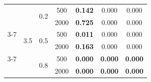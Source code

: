 \documentclass[10pt,a4paper]{amsart}
\numberwithin{equation}{section}
\begin{document}
\begin{table}[H]
\begin{tabular}{ccccccc}
& \multirow{6}{*}{3.5}
& \multirow{2}{*}{0.2}
& 500  & \textbf{0.142} & 0.000 & 0.000 \\
&  &  & 2000 & \textbf{0.725} & 0.000 & 0.000 \\
\cline{3-7}
&  & \multirow{2}{*}{0.5}
& 500  & \textbf{0.011} & 0.000 & 0.000 \\
&  &  & 2000 & \textbf{0.163} & 0.000 & 0.000 \\
\cline{3-7}
&  & \multirow{2}{*}{0.8}
& 500  & \textbf{0.000} & \textbf{0.000} & \textbf{0.000} \\
&  &  & 2000 & \textbf{0.000} & \textbf{0.000} & \textbf{0.000} \\
\hline

\end{tabular}
\end{table}
%
\end{document}
